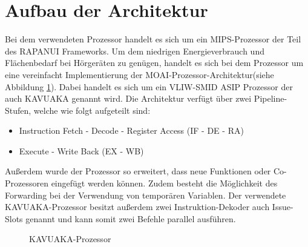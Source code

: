 \section{Aufbau der Architektur}
\label{chap:architecture_overview}
Bei dem verwendeten Prozessor handelt es sich um ein MIPS-Prozessor der Teil des RAPANUI Frameworks.
Um dem niedrigen Energieverbrauch und Flächenbedarf bei Hörgeräten zu genügen, handelt es sich bei dem Prozessor um eine vereinfacht Implementierung der MOAI-Prozessor-Architektur(siehe Abbildung \ref{fig:KAVUAKA}). Dabei handelt es sich um ein VLIW-SMID ASIP Prozessor der auch KAVUAKA genannt wird. Die Architektur verfügt über zwei Pipeline-Stufen, welche wie folgt aufgeteilt sind: 
\begin{itemize}
	\item[1.] Instruction Fetch - Decode - Register Access (IF - DE - RA) 
	\item[2.] Execute - Write Back (EX - WB)
\end{itemize}
Außerdem wurde der Prozessor so erweitert, dass neue Funktionen oder Co-Prozessoren eingefügt werden können. Zudem besteht die Möglichkeit des Forwarding bei der Verwendung von temporären Variablen.
Der verwendete KAVUAKA-Prozessor besitzt außerdem zwei Instruktion-Dekoder auch Issue-Slots genannt und kann somit zwei Befehle parallel ausführen.

\begin{scriptsize}
	\begin{figure}[htbp] 
		\centering
		
		\caption{KAVUAKA-Prozessor}
		\label{fig:KAVUAKA}
	\end{figure}
\end{scriptsize}


